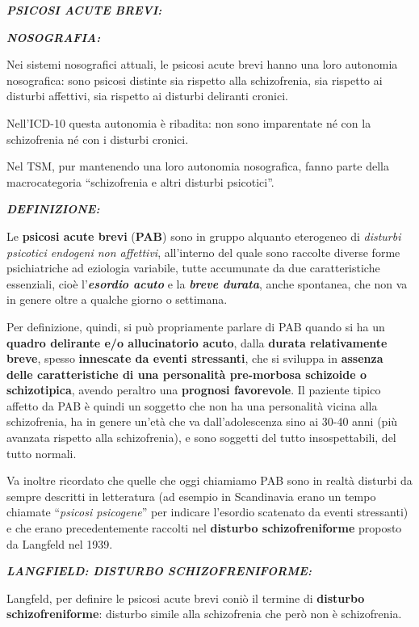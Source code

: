 \documentclass[]{article}
\date{}
\begin{document}
\textbf{\emph{PSICOSI ACUTE BREVI:}}

\textbf{\emph{NOSOGRAFIA:}}

Nei sistemi nosografici attuali, le psicosi acute brevi hanno una loro
autonomia nosografica: sono psicosi distinte sia rispetto alla
schizofrenia, sia rispetto ai disturbi affettivi, sia rispetto ai
disturbi deliranti cronici.

Nell'ICD-10 questa autonomia è ribadita: non sono imparentate né con la
schizofrenia né con i disturbi cronici.

Nel TSM, pur mantenendo una loro autonomia nosografica, fanno parte
della macrocategoria ``schizofrenia e altri disturbi psicotici''.

\textbf{\emph{DEFINIZIONE:}}

Le \textbf{psicosi acute brevi} (\textbf{PAB}) sono in gruppo alquanto
eterogeneo di \emph{disturbi psicotici endogeni non affettivi},
all'interno del quale sono raccolte diverse forme psichiatriche ad
eziologia variabile, tutte accumunate da due caratteristiche essenziali,
cioè l'\textbf{\emph{esordio acuto}} e la \textbf{\emph{breve durata}},
anche spontanea, che non va in genere oltre a qualche giorno o
settimana.

Per definizione, quindi, si può propriamente parlare di PAB quando si ha
un \textbf{quadro delirante e/o allucinatorio acuto}, dalla
\textbf{durata relativamente breve}, spesso \textbf{innescate da eventi
stressanti}, che si sviluppa in \textbf{assenza delle caratteristiche di
una personalità pre-morbosa schizoide o schizotipica}, avendo peraltro
una \textbf{prognosi favorevole}. Il paziente tipico affetto da PAB è
quindi un soggetto che non ha una personalità vicina alla schizofrenia,
ha in genere un'età che va dall'adolescenza sino ai 30-40 anni (più
avanzata rispetto alla schizofrenia), e sono soggetti del tutto
insospettabili, del tutto normali.

Va inoltre ricordato che quelle che oggi chiamiamo PAB sono in realtà
disturbi da sempre descritti in letteratura (ad esempio in Scandinavia
erano un tempo chiamate ``\emph{psicosi psicogene}'' per indicare
l'esordio scatenato da eventi stressanti) e che erano precedentemente
raccolti nel \textbf{disturbo schizofreniforme} proposto da Langfeld nel
1939.

\textbf{\emph{LANGFIELD: DISTURBO SCHIZOFRENIFORME:}}

Langfeld, per definire le psicosi acute brevi coniò il termine di
\textbf{disturbo schizofreniforme}: disturbo simile alla schizofrenia
che però non è schizofrenia.
\end{document}
